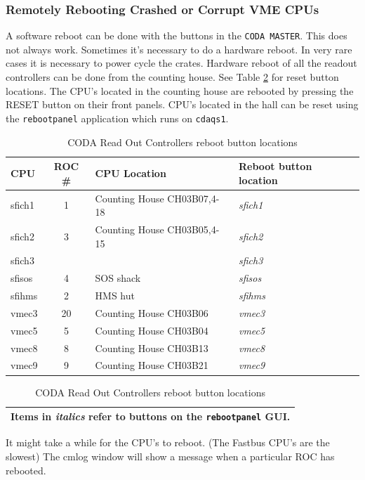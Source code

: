 \subsubsection{Remotely Rebooting Crashed or Corrupt VME CPUs}

\label{rebooting}
A software reboot can be done with the  buttons in the 
\verb|CODA MASTER|. This does not always work. Sometimes it's necessary to do 
a hardware reboot. In very rare cases it is necessary to power cycle the 
crates.   
Hardware reboot of all the readout controllers can be done from the 
counting house. See Table \ref{tab:CODA_resets} for reset button locations. The
CPU's located in the counting house are rebooted by pressing the RESET
button on their front panels.  CPU's located in the hall can be reset 
using the {\tt rebootpanel} application which runs on {\tt cdaqs1}.
\begin{center}
\begin{table}[hbt]
\begin{tabular}{|l|c|l|l|}\hline
CPU    & ROC \# & CPU Location               & Reboot button location \\ \hline
sfich1 & 1      & Counting House CH03B07,4-18 & {\it sfich1}          \\
sfich2 & 3      & Counting House CH03B05,4-15 & {\it sfich2}          \\
sfich3 &        &                             & {\it sfich3}          \\
sfisos & 4      & SOS shack                   & {\it sfisos}          \\
sfihms & 2      & HMS hut                     & {\it sfihms}          \\
vmec3  & 20     & Counting House CH03B06      & {\it vmec3}           \\
vmec5  & 5      & Counting House CH03B04      & {\it vmec5}           \\
vmec8  & 8      & Counting House CH03B13      & {\it vmec8}           \\
vmec9  & 9      & Counting House CH03B21      & {\it vmec9}           \\
\hline
\end{tabular}
\begin{tabular}{|l|}
Items in {\it italics} refer to buttons on the {\tt rebootpanel} GUI.\\
\hline
\end{tabular}
\caption{CODA Read Out Controllers reboot button locations\label{tab:CODA_resets}}
\end{table}
\end{center}
It might take a while for the CPU's to reboot.  (The Fastbus
CPU's are the slowest)
The cmlog window will show a message when a particular ROC has rebooted.


